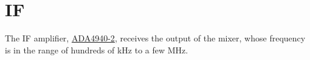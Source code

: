\section{IF}

The IF amplifier,
\href{http://www.analog.com/media/en/technical-documentation/data-sheets/ADA4940-1_4940-2.pdf}{ADA4940-2},
receives the output of the mixer, whose frequency is in the range of hundreds of kHz to a few MHz.